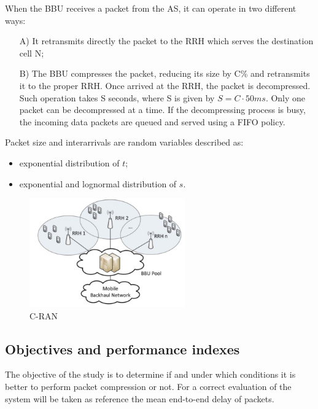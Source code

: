 \documentclass[11pt,a4paper,oneside, openright]{article}
\begin{document}
When the BBU receives a packet from the AS, it can operate in two different ways:
\begin{itemize}
	\item[A)]It retransmits directly the packet to the RRH which serves the destination cell N;
	\item[B)]The BBU compresses the packet, reducing its size by C\% and retransmits it to the proper RRH. Once arrived at the RRH, the packet is decompressed. Such operation takes S seconds, where S is given by $ S = C \cdot 50ms $. Only one packet can be decompressed at a time. If the decompressing process is busy, the incoming data packets are queued and served using a FIFO policy.
\end{itemize}

Packet size and interarrivals are random variables described as:
\begin{itemize}
	\item exponential distribution of $t$;
	\item exponential and lognormal distribution of $s$.
\end{itemize}

\begin{figure}[h]
	\centering
	\includegraphics[width=0.6\textwidth]{images/cran}
	\caption{C-RAN}
	\label{fig:cran}
\end{figure}

\subsection{Objectives and performance indexes}
The objective of the study is to determine if and under which conditions it is better to perform packet compression or not.
For a correct evaluation of the system will be taken as reference the mean end-to-end delay of packets.

\newpage
\end{document}
